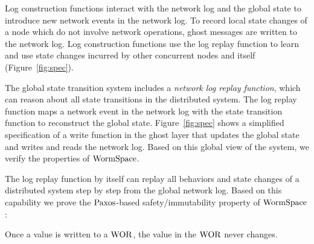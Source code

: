 Log construction functions interact with the network log and the global state to introduce new network events in the network log. To record local state changes of a node which do not involve network operations, ghost messages are written to the network log. Log construction functions use the log replay function to learn and use state changes incurred by other concurrent nodes and itself (Figure~\ref{fig:spec}).





The global state transition system includes a \textit{network log replay function}, which can reason about all state transitions in the distributed system. The log replay function maps a network event in the network log with the state transition function to reconstruct the global state. Figure~\ref{fig:spec} shows a simplified specification of a write function in the ghost layer that updates the global state and writes and reads the network log. Based on this global view of the system, we verify the properties of $\mathrm{WormSpace}$.



The log replay function by itself can replay all behaviors and state changes of a distributed system step by step from the global network log. Based on this capability we prove the $\mathrm{Paxos}$-based safety/immutability property of $\mathrm{WormSpace}$:

\begin{theorem}
 Once a value is written to a $\mathrm{WOR}$, the value in the $\mathrm{WOR}$ never changes.
 \end{theorem}



